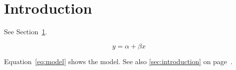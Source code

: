 \documentclass{article}
\begin{document}
\section{Introduction}
\label{sec:introduction}

See Section~\ref{sec:introduction}.

\begin{equation}
y = \alpha + \beta x
\label{eq:model}
\end{equation}

Equation~\eqref{eq:model} shows the model.
See also \autoref{sec:introduction} on page~\pageref{sec:introduction}.
\end{document}
